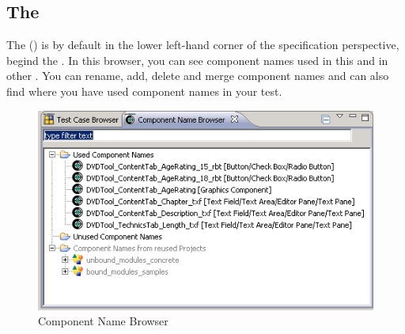 \subsection{The \gdcompnamebrowser}

The \gdcompnamebrowser{} () is by default in the lower left-hand corner of the specification perspective, begind the \gdtestcasebrowser{}. In this browser, you can see component names used in this \gdproject{} and in other \gdprojects{}. You can rename, add, delete and merge component names and can also find where you have used component names in your test. 
 

\begin{figure}[h]
\begin{center}
\includegraphics{Userinterface/Editors/PS/compnamesbrowser}
\caption{Component Name Browser}
\label{compnamesbrowser}
\end{center}
\end{figure}
